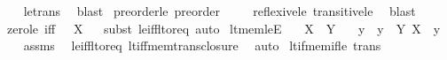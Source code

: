 \begin{isabellebody}
%
\isadelimproof
\ \ %
\endisadelimproof
%
\isatagproof
{}\isamarkupfalse%
\ le{\isacharunderscore}{\kern0pt}trans\ \isamarkupfalse%
\ blast%
\endisatagproof
{\isafoldproof}%
%
\isadelimproof
\isanewline
%
\endisadelimproof
\isanewline
{}\isamarkupfalse%
\ preorder{\isacharunderscore}{\kern0pt}le{\isacharcolon}{\kern0pt}\ {\isachardoublequoteopen}preorder\ {\isacharparenleft}{\kern0pt}{\isasymle}{\isacharparenright}{\kern0pt}{\isachardoublequoteclose}\isanewline
%
\isadelimproof
\ \ %
\endisadelimproof
%
\isatagproof
{}\isamarkupfalse%
\ reflexive{\isacharunderscore}{\kern0pt}le\ transitive{\isacharunderscore}{\kern0pt}le\ \isamarkupfalse%
\ blast%
\endisatagproof
{\isafoldproof}%
%
\isadelimproof
\isanewline
%
\endisadelimproof
\isanewline
{}\isamarkupfalse%
\ zero{\isacharunderscore}{\kern0pt}le\ {\isacharbrackleft}{\kern0pt}iff{\isacharbrackright}{\kern0pt}{\isacharcolon}{\kern0pt}\ {\isachardoublequoteopen}{}\ {\isasymle}\ X{\isachardoublequoteclose}%
\isadelimproof
\ %
\endisadelimproof
%
\isatagproof
{}\isamarkupfalse%
\ {\isacharparenleft}{\kern0pt}subst\ le{\isacharunderscore}{\kern0pt}iff{\isacharunderscore}{\kern0pt}lt{\isacharunderscore}{\kern0pt}or{\isacharunderscore}{\kern0pt}eq{\isacharparenright}{\kern0pt}\ auto%
\endisatagproof
{\isafoldproof}%
%
\isadelimproof
%
\endisadelimproof
\isanewline
\isanewline
{}\isamarkupfalse%
\ lt{\isacharunderscore}{\kern0pt}mem{\isacharunderscore}{\kern0pt}leE{\isacharcolon}{\kern0pt}\isanewline
\ \ \ {\isachardoublequoteopen}X\ {\isacharless}{\kern0pt}\ Y{\isachardoublequoteclose}\isanewline
\ \ \ y\ \ {\isachardoublequoteopen}y\ {\isasymin}\ Y{\isachardoublequoteclose}\ {\isachardoublequoteopen}X\ {\isasymle}\ y{\isachardoublequoteclose}\isanewline
%
\isadelimproof
\ \ %
\endisadelimproof
%
\isatagproof
{}\isamarkupfalse%
\ assms\ \isamarkupfalse%
\ le{\isacharunderscore}{\kern0pt}iff{\isacharunderscore}{\kern0pt}lt{\isacharunderscore}{\kern0pt}or{\isacharunderscore}{\kern0pt}eq\ lt{\isacharunderscore}{\kern0pt}iff{\isacharunderscore}{\kern0pt}mem{\isacharunderscore}{\kern0pt}trans{\isacharunderscore}{\kern0pt}closure\ \isamarkupfalse%
\ auto%
\endisatagproof
{\isafoldproof}%
%
\isadelimproof
\isanewline
%
\endisadelimproof
\isanewline
{}\isamarkupfalse%
\ lt{\isacharunderscore}{\kern0pt}if{\isacharunderscore}{\kern0pt}mem{\isacharunderscore}{\kern0pt}if{\isacharunderscore}{\kern0pt}le\ {\isacharbrackleft}{\kern0pt}trans{\isacharbrackright}{\kern0pt}{\isacharcolon}{\kern0pt}\isanewline

\end{isabellebody}
